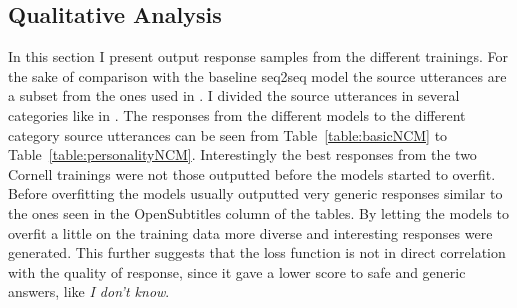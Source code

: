 \documentclass[12pt]{article}
\begin{document}
\subsection{Qualitative Analysis} \label{ssec:52}
In this section I present output response samples from the different trainings. For the sake of comparison with the baseline seq2seq model the source utterances are a subset from the ones used in \cite{Vinyals:2015}. I divided the source utterances in several categories like in \cite{Vinyals:2015}. The responses from the different models to the different category source utterances can be seen from Table~\ref{table:basicNCM} to Table~\ref{table:personalityNCM}. Interestingly the best responses from the two Cornell trainings were not those outputted before the models started to overfit. Before overfitting the models usually outputted very generic responses similar to the ones seen in the OpenSubtitles column of the tables. By letting the models to overfit a little on the training data more diverse and interesting responses were generated. This further suggests that the loss function is not in direct correlation with the quality of response, since it gave a lower score to safe and generic answers, like \textit{I don't know}.
\end{document}

